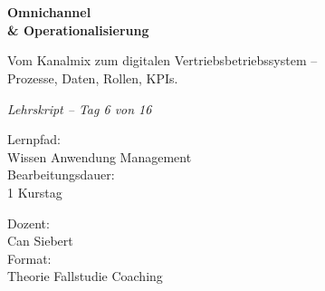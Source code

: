 \documentclass[11pt,a4paper,oneside]{article}
\newcommand{\caveatfontfallback}{\itshape}
\newcommand\caveatfont{\caveatfontfallback}%
\begin{document}
\begin{titlepage}
  \pagestyle{empty}
  \vspace*{1.5cm}
  \\[2pt]
  \noindent{\color{lpAccent}\rule{\linewidth}{1.2pt}}\\[4pt]

  \vspace{3cm}
  {\sffamily\fontsize{30}{34}\selectfont\bfseries\color{lpInk}Omnichannel\\\& Operationalisierung\par}

  \vspace{0.7cm}
  {\sffamily\large\color{lpGray}Vom Kanalmix zum digitalen Vertriebs­betriebssystem --\\Prozesse, Daten, Rollen, KPIs.\par}

  \vspace{1.5cm}
  {\caveatfont\LARGE\color{lpAmber}Lehrskript -- Tag 6 von 16}\par

  \vfill

  \noindent\begin{minipage}{0.55\linewidth}
    {\sffamily\footnotesize\color{lpGray}Lernpfad:}\\
    {\sffamily\small\color{lpInk}Wissen \textrightarrow{} Anwendung \textrightarrow{} Management}\\[10pt]
    {\sffamily\footnotesize\color{lpGray}Bearbeitungsdauer:}\\
    {\sffamily\small\color{lpInk}1 Kurstag}
  \end{minipage}\hfill
  \begin{minipage}{0.4\linewidth}
    \raggedleft
    {\sffamily\footnotesize\color{lpGray}Dozent:}\\
    {\sffamily\small\color{lpInk}Can Siebert}\\[10pt]
    {\sffamily\footnotesize\color{lpGray}Format:}\\
    {\sffamily\small\color{lpInk}Theorie \textperiodcentered{} Fallstudie \textperiodcentered{} Coaching}
  \end{minipage}

  \vspace{0.5cm}
  \noindent{\color{lpAccent}\rule{\linewidth}{0.6pt}}
\end{titlepage}
\end{document}
